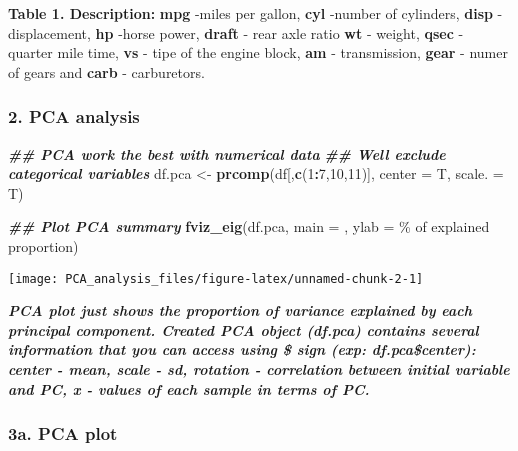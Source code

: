 \documentclass[
  5pt,
]{article}
\newenvironment{Shaded}{\begin{snugshade}}{\end{snugshade}}
\newcommand{\AttributeTok}[1]{\textcolor[rgb]{0.13,0.29,0.53}{#1}}
\newcommand{\DecValTok}[1]{\textcolor[rgb]{0.00,0.00,0.81}{#1}}
\newcommand{\DocumentationTok}[1]{\textcolor[rgb]{0.56,0.35,0.01}{\textbf{\textit{#1}}}}
\newcommand{\FunctionTok}[1]{\textcolor[rgb]{0.13,0.29,0.53}{\textbf{#1}}}
\newcommand{\NormalTok}[1]{#1}
\newcommand{\OtherTok}[1]{\textcolor[rgb]{0.56,0.35,0.01}{#1}}
\newcommand{\SpecialCharTok}[1]{\textcolor[rgb]{0.81,0.36,0.00}{\textbf{#1}}}
\newcommand{\StringTok}[1]{\textcolor[rgb]{0.31,0.60,0.02}{#1}}
\begin{document}
\textbf{Table 1. Description:} \textbf{mpg} -miles per gallon,
\textbf{cyl} -number of cylinders, \textbf{disp} -displacement,
\textbf{hp} -horse power, \textbf{draft} - rear axle ratio \textbf{wt} -
weight, \textbf{qsec} - quarter mile time, \textbf{vs} - tipe of the
engine block, \textbf{am} - transmission, \textbf{gear} - numer of gears
and \textbf{carb} - carburetors.

\pagebreak

\subsubsection{2. PCA analysis}\label{pca-analysis}

\begin{Shaded}
\begin{Highlighting}[]
\DocumentationTok{\#\# PCA work the best with numerical data }
\DocumentationTok{\#\# We\textquotesingle{}ll exclude categorical variables}
\NormalTok{df.pca }\OtherTok{\textless{}{-}} \FunctionTok{prcomp}\NormalTok{(df[,}\FunctionTok{c}\NormalTok{(}\DecValTok{1}\SpecialCharTok{:}\DecValTok{7}\NormalTok{,}\DecValTok{10}\NormalTok{,}\DecValTok{11}\NormalTok{)], }\AttributeTok{center =}\NormalTok{ T, }\AttributeTok{scale. =}\NormalTok{ T)}

\DocumentationTok{\#\# Plot PCA summary}
\FunctionTok{fviz\_eig}\NormalTok{(df.pca, }\AttributeTok{main =} \StringTok{\textquotesingle{}\textquotesingle{}}\NormalTok{, }\AttributeTok{ylab =} \StringTok{\textquotesingle{}\% of explained proportion\textquotesingle{}}\NormalTok{)}
\end{Highlighting}
\end{Shaded}

\begin{center}\texttt{[image: PCA\_analysis\_files/figure-latex/unnamed-chunk-2-1]} \end{center}

\textbf{\emph{PCA plot just shows the proportion of variance explained
by each principal component. Created PCA object (df.pca) contains
several information that you can access using \$ sign (exp:
df.pca\$center): center - mean, scale - sd, rotation - correlation
between initial variable and PC, x - values of each sample in terms of
PC.}}

\pagebreak

\subsubsection{3a. PCA plot}\label{a.-pca-plot}
\end{document}
